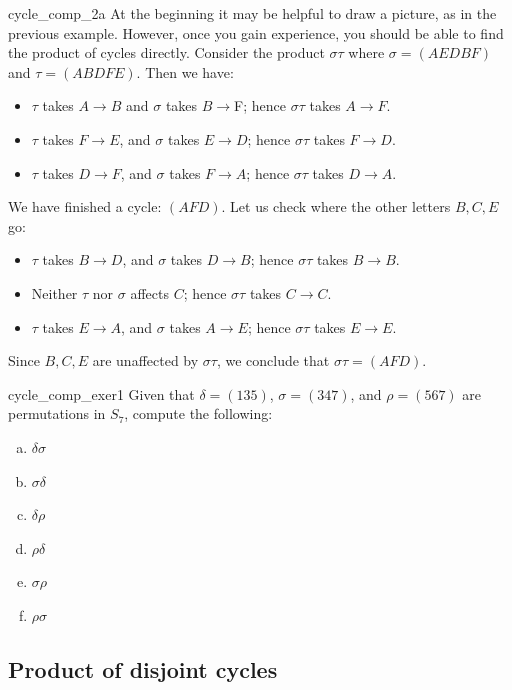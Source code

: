 \begin{example}{cycle_comp_2a}
At the beginning it may be helpful to draw a picture, as in the previous example. However, once you gain experience, you should be able to find the product of cycles directly.  Consider the product  $\sigma\tau$ where $\sigma = (AEDBF)$ and $\tau=(ABDFE)$.  Then we have:

\begin{itemize}
\item
$\tau$ takes $A \to B$  and $\sigma$ takes $B \to $F; hence $\sigma \tau$ takes $A \to F$.
\item
$\tau$ takes $F \to E$, and $\sigma$ takes $E \to D$; hence $\sigma \tau$ takes $F \to D$.
\item
$\tau$ takes $D \to F$, and $\sigma$ takes $F \to A$; hence $\sigma \tau$ takes $D \to A$.
\end{itemize}
We have finished a cycle:  $(AFD)$.  Let us check where the other letters $B, C, E$ go:
\begin{itemize}
\item
$\tau$ takes $B \to D$, and $\sigma$ takes $D \to B$; hence $\sigma \tau$ takes $B \to B$.
\item
Neither $\tau$ nor $\sigma$ affects $C$; hence $\sigma \tau$ takes $C \to C$.
\item
$\tau$ takes $E \to A$, and $\sigma$ takes $A \to E$; hence $\sigma \tau$ takes $E \to E$.
\end{itemize}
Since $B, C, E$ are unaffected by $\sigma \tau$, we conclude that $\sigma \tau=(AFD)$.
\end{example}

\begin{exercise}{cycle_comp_exer1}
Given that $\delta = (135)$, $\sigma = (347)$, and $\rho = (567)$ are permutations in $S_7$, compute the following:
\begin{multicols}{3}
\begin{enumerate}[(a)]
\item
$\delta \sigma$
\item
$\sigma \delta$
\item
$\delta \rho$
\item
$\rho \delta$
\item
$\sigma \rho$
\item
$\rho \sigma$
\end{enumerate}
\end{multicols}
\end{exercise}

\subsection{Product of disjoint cycles}
\label{subsec:Permutations:CycleNotation:ProductDisjointCycles}

